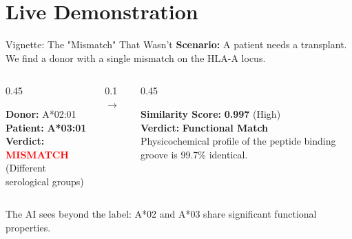 \documentclass[aspectratio=169]{beamer}
\newcommand{\keytakeaway}[1]{\vspace{0.3cm}\begin{tcolorbox}[colback=yellow!10,colframe=yellow!50!black,title=Key Takeaway]\small #1\end{tcolorbox}}
\begin{document}
\section{Live Demonstration}

\begin{frame}{Vignette: The "Mismatch" That Wasn't}
  \footnotesize
  \textbf{Scenario:} A patient needs a transplant. We find a donor with a single mismatch on the HLA-A locus.
  
  \vspace{0.05cm}
  
  \begin{columns}
    \begin{column}{0.45\textwidth}
      \begin{tcolorbox}[colback=red!5,colframe=red!50,title=Standard Analysis]
      \textbf{Donor:} A*02:01 \\
      \textbf{Patient:} \textbf{A*03:01} \\
      \vspace{0.05cm}
      \textbf{Verdict:} \textcolor{red}{\textbf{MISMATCH}} \\
      (Different serological groups)
      \end{tcolorbox}
    \end{column}
    \begin{column}{0.1\textwidth}
      \centering
      \Huge $\rightarrow$
    \end{column}
    \begin{column}{0.45\textwidth}
      \begin{tcolorbox}[colback=green!5,colframe=green!50,title=AI Analysis (ProtBERT)]
      \textbf{Similarity Score:} \textbf{0.997} (High) \\
      \vspace{0.05cm}
      \textbf{Verdict:} \textcolor{managementcolor}{\textbf{Functional Match}} \\
      \scriptsize
      Physicochemical profile of the peptide binding groove is 99.7\% identical.
      \end{tcolorbox}
    \end{column}
  \end{columns}
  
  \vspace{-0.2cm} %
  \keytakeaway{The AI sees beyond the label: A*02 and A*03 share significant functional properties.}
\end{frame}
\end{document}
